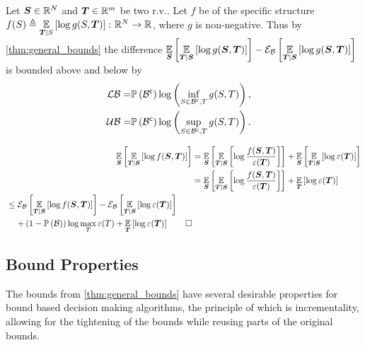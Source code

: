 \begin{propositionE}
\label{thm:bound_exp}
	Let $\boldsymbol S\in\mathbb{R}^N$ and $\boldsymbol T\in\mathbb{R}^m$ be two r.v.. Let $f$ be of the specific structure $f(S)\triangleq \operatorname*{\mathbb{E}}\limits_{\boldsymbol T\mid S}\left[{\log g(S,\boldsymbol T)}\right]\colon\mathbb{R}^N\to\mathbb{R}$, where $g$ is non-negative. Thus by \cref{thm:general_bounds} the difference $\operatorname*{\mathbb{E}}\limits_{\boldsymbol S}\left[{\operatorname*{\mathbb{E}}\limits_{\boldsymbol T\mid\boldsymbol S}\left[{\log g(\boldsymbol S,\boldsymbol T)}\right]}\right]-
	\mathcal{E}_{\mathcal B}\left[{\operatorname*{\mathbb{E}}\limits_{\boldsymbol T\mid\boldsymbol S}\left[{\log g(\boldsymbol S,\boldsymbol T)}\right]}\right]$ is bounded above and below by
	\begin{align}
		\begin{split}
			\operatorname*{\mathcal{LB}}=&\mathbb{P}\left({{\mathcal B}^{\mathsf{c}}}\right)\log\left(\inf_{S\in{\ensuremath{\mathcal B}}^{\mathsf{c}},T}g(S,T)\right),
		\end{split}\label{eq:bound_lower_exp}
		\\
		\begin{split}
			\operatorname*{\mathcal{UB}}=&\mathbb{P}\left({{\mathcal B}^{\mathsf{c}}}\right)\log\left(\sup_{S\in{\ensuremath{\mathcal B}}^{\mathsf{c}},T}g(S,T)\right).
		\end{split}\label{eq:bound_upper_exp}
	\end{align}
\end{propositionE}
\begin{proofE}
	\begin{align*}
		\expectation{\expectation{\log f(\RV,\RVI)}{\RVI\mid\RV}}{\RV}&=\expectation{\expectation{\log \frac{f(\RV,\RVI)}{\varepsilon(\RVI)}}{\RVI\mid\RV}}{\RV}+\expectation{\expectation{\log \varepsilon(\RVI)}{\RVI\mid\RV}}{\RV}
		\\
		&=\expectation{\expectation{\log \frac{f(\RV,\RVI)}{\varepsilon(\RVI)}}{\RVI\mid\RV}}{\RV}+\expectation{\log \varepsilon(\RVI)}{\RVI}
		\\
		\begin{split}
			&\leq\partialexpectation{\expectation{\log f(\RV,\RVI)}{\RVI\mid\RV}}{\subSpace}-\partialexpectation{\expectation{\log \varepsilon(\RVI)}{\RVI\mid\RV}}{\subSpace}\\
			&\phantomeq+\left(1-\measure{\subSpace}\right)\log\max_{\variableI}\varepsilon(\variableI)+\expectation{\log \varepsilon(\RVI)}{\RVI}\qedhere
		\end{split}
	\end{align*}
\end{proofE}

\subsection{Bound Properties}
The bounds from \cref{thm:general_bounds} have several desirable properties for bound based decision making algorithms, the principle of which is incrementality, allowing for the tightening of the bounds while reusing parts of the original bounds.


